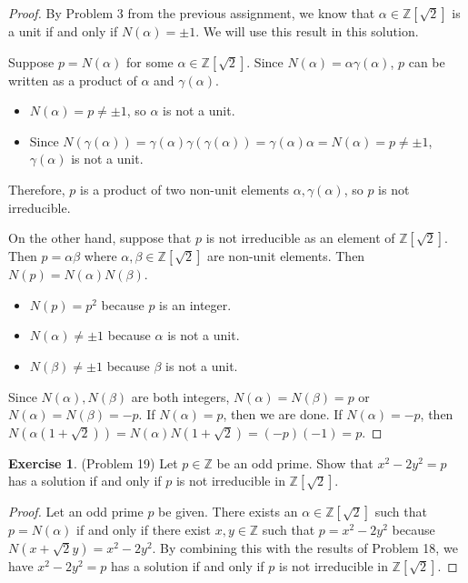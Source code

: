 \documentclass[12pt, psamsfonts]{amsart}
\theoremstyle{definition}
\newtheorem*{exer}{Exercise}
\theoremstyle{remark}
\numberwithin{equation}{section}
\begin{document}
\begin{proof}
  By Problem 3 from the previous assignment, we know that $\alpha \in \mathbb{Z}[\sqrt{2}]$ is a unit if and only if $N(\alpha) = \pm 1$.
  We will use this result in this solution.

  Suppose $p = N(\alpha)$ for some $\alpha \in \mathbb{Z}[\sqrt{2}]$.
  Since $N(\alpha) = \alpha\gamma(\alpha)$, $p$ can be written as a product of $\alpha$ and $\gamma(\alpha)$.
  \begin{itemize}
    \item
      $N(\alpha) = p \ne \pm 1$, so $\alpha$ is not a unit.
    \item
      Since $N(\gamma(\alpha)) = \gamma(\alpha)\gamma(\gamma(\alpha)) = \gamma(\alpha)\alpha = N(\alpha) = p \ne \pm 1$, $\gamma(\alpha)$ is not a unit.
  \end{itemize}
  Therefore, $p$ is a product of two non-unit elements $\alpha, \gamma(\alpha)$, so $p$ is not irreducible.

  On the other hand, suppose that $p$ is not irreducible as an element of $\mathbb{Z}[\sqrt{2}]$.
  Then $p = \alpha\beta$ where $\alpha, \beta \in \mathbb{Z}[\sqrt{2}]$ are non-unit elements.
  Then $N(p) = N(\alpha)N(\beta)$.

  \begin{itemize}
    \item
      $N(p) = p^2$ because $p$ is an integer.
    \item
      $N(\alpha) \ne \pm 1$ because $\alpha$ is not a unit.
    \item
      $N(\beta) \ne \pm 1$ because $\beta$ is not a unit.
  \end{itemize}
  Since $N(\alpha), N(\beta)$ are both integers, $N(\alpha) = N(\beta) = p$ or $N(\alpha) = N(\beta) = -p$.
  If $N(\alpha) = p$, then we are done.
  If $N(\alpha) = -p$, then $N(\alpha(1 + \sqrt{2})) = N(\alpha)N(1 + \sqrt{2}) = (-p)(-1) = p$.
\end{proof}

\begin{exer}{(Problem 19)}
  Let $p \in \mathbb{Z}$ be an odd prime.
  Show that $x^2 - 2y^2 = p$ has a solution if and only if $p$ is not irreducible in $\mathbb{Z}[\sqrt{2}]$.
\end{exer}

\begin{proof}
  Let an odd prime $p$ be given.
  There exists an $\alpha \in \mathbb{Z}[\sqrt{2}]$ such that $p = N(\alpha)$ if and only if there exist $x, y \in \mathbb{Z}$ such that $p = x^2 - 2y^2$ because $N(x + \sqrt{2}y) = x^2 - 2y^2$.
  By combining this with the results of Problem 18, we have $x^2 - 2y^2 = p$ has a solution if and only if $p$ is not irreducible in $\mathbb{Z}[\sqrt{2}]$.
\end{proof}
\end{document}
